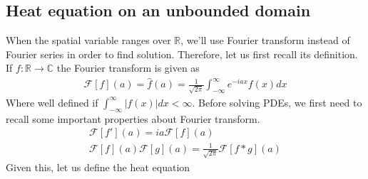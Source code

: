\subsection{Heat equation on an unbounded domain}
When the spatial variable ranges over $ \mathbb{R}$, we'll use Fourier transform instead of Fourier series in order to find solution. Therefore, let us first recall its definition. If $f : \mathbb{R} \to \mathbb{C}$ the Fourier transform is given as 
\begin{align*} 
	\mathcal{F}\left[f\right]\left(a\right) = \hat{f}\left(a\right) = \frac{1}{\sqrt{2\pi}} \int_{-\infty}^{\infty}e^{-iax}f\left(x\right)dx
\end{align*}
Where well defined if $\int_{-\infty}^{\infty}\left|f\left(x\right)\right|dx < \infty$. Before solving PDEs, we first need to recall some important properties about Fourier transform.
\begin{align*} 
	\mathcal{F}\left[f'\right]\left(a\right) = ia \mathcal{F}\left[f\right]\left(a\right)\\
	\mathcal{F}\left[f\right]\left(a\right)\mathcal{F}\left[g\right]\left(a\right) = \frac{1}{\sqrt{2\pi}}\mathcal{F}\left[f \ast g\right]\left(a\right)
\end{align*}
Given this, let us define the heat equation 
